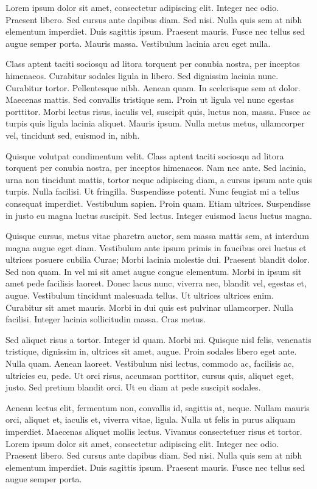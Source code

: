 \documentclass[10pt]{deptletter}
\begin{document}

Lorem ipsum dolor sit amet, consectetur adipiscing elit. Integer nec odio.
Praesent libero. Sed cursus ante dapibus diam. Sed nisi. Nulla quis sem at
nibh elementum imperdiet. Duis sagittis ipsum. Praesent mauris. Fusce nec
tellus sed augue semper porta. Mauris massa. Vestibulum lacinia arcu eget
nulla. 

Class aptent taciti sociosqu ad litora torquent per conubia nostra, per
inceptos himenaeos. Curabitur sodales ligula in libero. Sed dignissim
lacinia nunc. Curabitur tortor. Pellentesque nibh. Aenean quam. In
scelerisque sem at dolor. Maecenas mattis. Sed convallis tristique sem.
Proin ut ligula vel nunc egestas porttitor. Morbi lectus risus, iaculis
vel, suscipit quis, luctus non, massa. Fusce ac turpis quis ligula lacinia
aliquet. Mauris ipsum. Nulla metus metus, ullamcorper vel, tincidunt sed,
euismod in, nibh. 

Quisque volutpat condimentum velit. Class aptent taciti sociosqu ad litora
torquent per conubia nostra, per inceptos himenaeos. Nam nec ante. Sed
lacinia, urna non tincidunt mattis, tortor neque adipiscing diam, a cursus
ipsum ante quis turpis. Nulla facilisi. Ut fringilla. Suspendisse potenti.
Nunc feugiat mi a tellus consequat imperdiet. Vestibulum sapien. Proin
quam. Etiam ultrices. Suspendisse in justo eu magna luctus suscipit. Sed
lectus. Integer euismod lacus luctus magna. 

Quisque cursus, metus vitae pharetra auctor, sem massa mattis sem, at
interdum magna augue eget diam. Vestibulum ante ipsum primis in faucibus
orci luctus et ultrices posuere cubilia Curae; Morbi lacinia molestie dui.
Praesent blandit dolor. Sed non quam. In vel mi sit amet augue congue
elementum. Morbi in ipsum sit amet pede facilisis laoreet. Donec lacus
nunc, viverra nec, blandit vel, egestas et, augue. Vestibulum tincidunt
malesuada tellus. Ut ultrices ultrices enim. Curabitur sit amet mauris.
Morbi in dui quis est pulvinar ullamcorper. Nulla facilisi. Integer lacinia
sollicitudin massa. Cras metus. 

Sed aliquet risus a tortor. Integer id quam. Morbi mi. Quisque nisl felis,
venenatis tristique, dignissim in, ultrices sit amet, augue. Proin sodales
libero eget ante. Nulla quam. Aenean laoreet. Vestibulum nisi lectus,
commodo ac, facilisis ac, ultricies eu, pede. Ut orci risus, accumsan
porttitor, cursus quis, aliquet eget, justo. Sed pretium blandit orci. Ut
eu diam at pede suscipit sodales. 

Aenean lectus elit, fermentum non, convallis id, sagittis at, neque. Nullam
mauris orci, aliquet et, iaculis et, viverra vitae, ligula. Nulla ut felis
in purus aliquam imperdiet. Maecenas aliquet mollis lectus. Vivamus
consectetuer risus et tortor. Lorem ipsum dolor sit amet, consectetur
adipiscing elit. Integer nec odio. Praesent libero. Sed cursus ante dapibus
diam. Sed nisi. Nulla quis sem at nibh elementum imperdiet. Duis sagittis
ipsum. Praesent mauris. Fusce nec tellus sed augue semper porta. 
\end{document}
